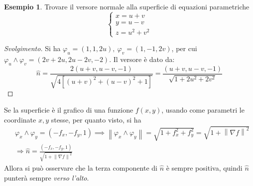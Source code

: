 \documentclass[11pt, a4paper]{scrartcl}
\newenvironment{svolgimento}{\renewcommand\qedsymbol{$\blacksquare$}\begin{proof}[Svolgimento]}{\end{proof}}
\theoremstyle{definition}
\newtheorem{esempio}{Esempio}
\numberwithin{esempio}{section}
\theoremstyle{definition}
\numberwithin{obs}{section}
\numberwithin{nota}{section}
\numberwithin{equation}{subsection}
\begin{document}
\begin{esempio}
Trovare il versore normale alla superficie di equazioni parametriche 
\[
\begin{cases}
	x = u + v \\
	y = u -v \\
	z= u^2 + v^2
\end{cases}
\] 
\begin{svolgimento}
Si ha $\varphi _u = (1,1,2u), \ \varphi _v = (1,-1,2v)$, per cui $\varphi _u \wedge \varphi _v = (2v+2u, 2u-2v,-2) $. 
Il versore \`e dato da:
\[
\hat{n} = \frac{2 (u+v , u-v ,-1)}{\sqrt{4 \left[ (u+v)^2 + (u-v)^2 + 1  \right] } } = \frac{(u+v,u-v,-1)}{\sqrt{1+2u^2 + 2v^2} }
\] 

\end{svolgimento}
\end{esempio}
Se la superficie \`e il grafico di una funzione $f(x,y)$, usando come parametri le coordinate $x,y$ stesse, per quanto visto, si ha
\[
	\begin{split}
		&\varphi _x \wedge   \varphi _y = (-f_x , -f_y ,1) \implies \left\lVert \varphi _x \wedge \varphi _y \right\rVert = \sqrt{1+ f_x^2 + f_y^2} = \sqrt{1+ \left\lVert \nabla f \right\rVert ^2} \\
		&\Rightarrow \hat{n}=\frac{(-f_x,-f_y,1)}{\sqrt{1+\left\lVert \nabla f \right\rVert ^2} }
	\end{split}
\] 
Allora si pu\`o osservare che la terza componente di $\hat{n}$ \`e sempre positiva, quindi $\hat{n}$ punter\`a sempre \textit{verso l'alto}.
\end{document}
